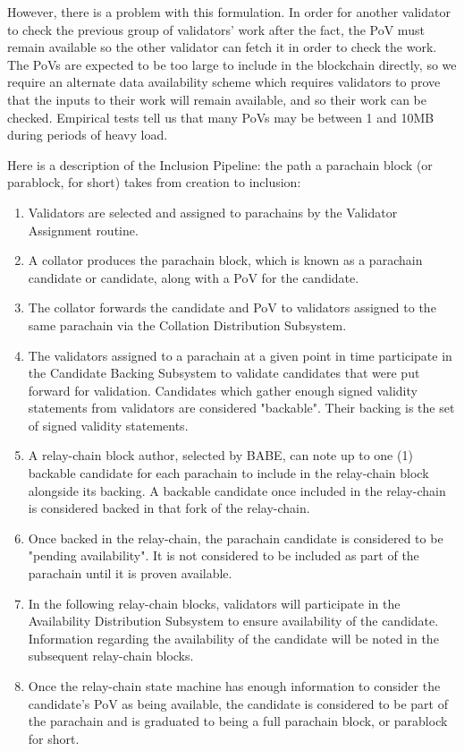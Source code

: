 However, there is a problem with this formulation. In order for another validator to check the previous group of validators' work after the fact, the PoV must remain available so the other validator can fetch it in order to check the work. The PoVs are expected to be too large to include in the blockchain directly, so we require an alternate data availability scheme which requires validators to prove that the inputs to their work will remain available, and so their work can be checked. Empirical tests tell us that many PoVs may be between 1 and 10MB during periods of heavy load.

Here is a description of the Inclusion Pipeline: the path a parachain block (or parablock, for short) takes from creation to inclusion:

\begin{enumerate}
    \item Validators are selected and assigned to parachains by the Validator Assignment routine.
    \item A collator produces the parachain block, which is known as a parachain candidate or candidate, along with a PoV for the candidate.
    \item The collator forwards the candidate and PoV to validators assigned to the same parachain via the Collation Distribution Subsystem.
    \item The validators assigned to a parachain at a given point in time participate in the Candidate Backing Subsystem to validate candidates that were put forward for validation. Candidates which gather enough signed validity statements from validators are considered "backable". Their backing is the set of signed validity statements.
    \item A relay-chain block author, selected by BABE, can note up to one (1) backable candidate for each parachain to include in the relay-chain block alongside its backing. A backable candidate once included in the relay-chain is considered backed in that fork of the relay-chain.
    \item Once backed in the relay-chain, the parachain candidate is considered to be "pending availability". It is not considered to be included as part of the parachain until it is proven available.
    \item In the following relay-chain blocks, validators will participate in the Availability Distribution Subsystem to ensure availability of the candidate. Information regarding the availability of the candidate will be noted in the subsequent relay-chain blocks.
    \item Once the relay-chain state machine has enough information to consider the candidate's PoV as being available, the candidate is considered to be part of the parachain and is graduated to being a full parachain block, or parablock for short.
\end{enumerate}

